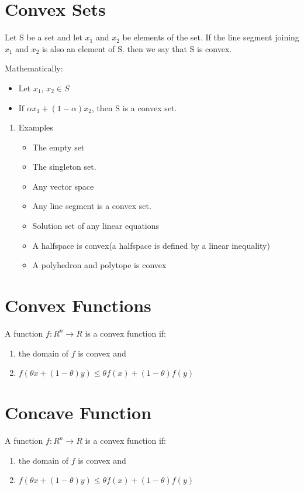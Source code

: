 \documentclass[11pt]{report}
\begin{document}
\section{Convex Sets}
\label{sec:orgb6abde8}
Let S be a set and let \(x_1\) and \(x_2\) be elements of the set. If the line segment joining \(x_1\) and \(x_2\) is also an element of S. then we say that S is convex.

Mathematically:
\begin{itemize}
\item Let \(x_1\), \(x_2 \in S\)
\item If \(\alpha x_1 + (1 - \alpha) x_{2}\), then S is a convex set.
\end{itemize}
\begin{enumerate}
\item Examples
\label{sec:org1068082}
\begin{itemize}
\item The empty set
\item The singleton set.
\item Any vector space
\item Any line segment is a convex set.
\item Solution set of any linear equations
\item A halfspace is convex(a halfspace is defined by a linear inequality)
\item A polyhedron and polytope is convex
\end{itemize}
\end{enumerate}
\section{Convex Functions}
\label{sec:orgd3fc8e1}
A function \(f: R^n \rightarrow R\) is a convex function if:
\begin{enumerate}
\item the domain of \(f\) is convex and
\item \(f(\theta x + (1 - \theta)y) \le \theta f(x) + (1- \theta) f(y)\)
\end{enumerate}
\section{Concave Function}
\label{sec:org8778ad7}
A function \(f: R^n \rightarrow R\) is a convex function if:
\begin{enumerate}
\item the domain of \(f\) is convex and
\item \(f(\theta x + (1 - \theta)y) \le \theta f(x) + (1- \theta) f(y)\)
\end{enumerate}
\end{document}
